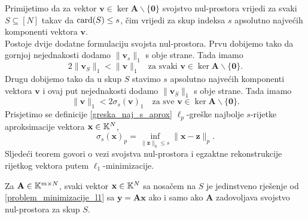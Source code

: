 \documentclass[a4paper,twoside,12pt]{memoir} %
\newcommand{\vect}[1]{\mathbf{#1}}
\renewcommand{\vec}{\vect}
\newcommand{\card}{\text{\normalfont{card}}}
\newcommand{\norm}[1]{\|{#1}\|}
\begin{document}
Primijetimo da za vektor $\vec v \in \ker \vec A \backslash \{ \vec 0\}$ svojstvo nul-prostora vrijedi za svaki $S \subseteq [N]$ takav da $\card(S) \leq s$, \v{c}im vrijedi za skup indeksa $s$ apsolutno najve\'cih komponenti vektora $\vec v$. \\
\indent Postoje dvije dodatne formulaciju svojsta nul-prostora. Prvu dobijemo tako da gornjoj nejednakosti dodamo $\norm{\vec v_s}_1$ s obje strane. Tada imamo
\begin{equation}\label{svojstvo_nul_prostora_form_1}
    2 \norm{\vec v_S}_1 < \norm{\vec v}_1 \quad \text{za svaki } \vec v \in \ker \vec A \backslash \{\vec 0\}.
\end{equation}
Drugu dobijemo tako da u skup $S$ stavimo $s$ apsolutno najve\'cih  komponenti vektora $\vec v$ i ovaj put nejednakosti dodamo $\norm{\vec v_{\bar S}}_1$ s obje strane. Tada imamo
\begin{equation}\label{svojstvo_nul_prostora_form_2}
    \norm{\vec v}_1 < 2 \sigma_s(\vec v)_1 \quad \text{za sve } \vec v \in \ker \vec A \backslash \{\vec 0\}.
\end{equation}
Prisjetimo se definicije \ref{greska_naj_s_aprox} $\ell_p$-gre\v{s}ke najbolje $s$-rijetke aproksimacije vektora $\vec x \in \K^N$,
\begin{equation*}
    \sigma_s(\vec x)_p = \inf_{\norm{\vec z}_0 \leq s} \norm{\vec x - \vec z}_p.
\end{equation*}
Sljede\'ci teorem govori o vezi svojstva nul-prostora i egzaktne rekonstrukcije rijetkog vektora putem $\ell_1$-minimizacije.
\begin{thm}\label{bp_tm1}
    Za $\vec A \in \K^{m \times N}$, svaki vektor $\vec x \in \K^N$ sa nosa\v{c}em na $S$ je jedinstveno rje\v{s}enje od \eqref{problem_minimizacije_l1} sa $\vec y = \vec {Ax}$ ako i samo ako $\vec A$ zadovoljava svojstvo nul-prostora za skup $S$.
\end{thm}
\end{document}
